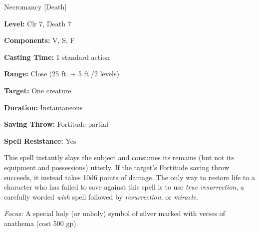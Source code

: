 
Necromancy [Death]

\textbf{Level:} Clr 7, Death 7

\textbf{Components:} V, S, F

\textbf{Casting Time:} 1 standard action

\textbf{Range:} Close (25 ft. + 5 ft./2 levels)

\textbf{Target:} One creature

\textbf{Duration:} Instantaneous

\textbf{Saving Throw:} Fortitude partial

\textbf{Spell Resistance:} Yes

This spell instantly slays the subject and consumes its remains (but not its equipment 
and possessions) utterly. If the target's Fortitude saving throw succeeds, it instead 
takes 10d6 points of damage. The only way to restore life to a character who has 
failed to save against this spell is to use \textit{true resurrection}, a carefully 
worded \textit{wish} spell followed by \textit{resurrection}, or \textit{miracle}.

\textit{Focus:} A special holy (or unholy) symbol of silver marked with verses 
of anathema (cost 500 gp).

